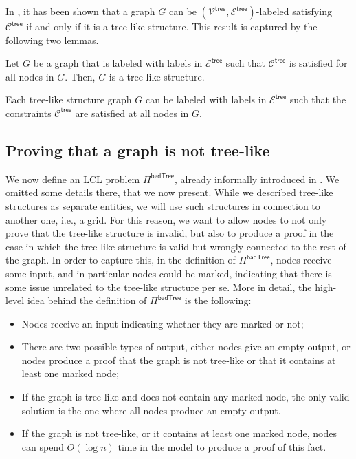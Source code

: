 \documentclass[11pt]{article}
\newcommand{\ltreelike}{\mathsf {tree}}
\newcommand{\lbadtree}{\mathsf {badTree}}
\begin{document}
In \cite{congest-lcls}, it has been shown that a graph $G$ can be $(\mathcal{V^\ltreelike},\mathcal{E^\ltreelike})$-labeled satisfying $\mathcal{C}^{\ltreelike}$ if and only if it is a tree-like structure. This result is captured by the following two lemmas.
\begin{lemma}\label{lem:treelike}
	Let $G$ be a graph that is labeled with labels in $\mathcal{E^\ltreelike}$ such that $\mathcal{C}^{\ltreelike}$ is satisfied for all nodes in $G$. Then, $G$ is a tree-like structure.
\end{lemma}

\begin{lemma}\label{lem:treelike2}
	Each tree-like structure graph $G$ can be labeled with labels in $\mathcal{E^\ltreelike}$ such that the constraints $\mathcal{C}^{\ltreelike}$ are satisfied at all nodes in $G$. 
\end{lemma}


\subsection{Proving that a graph is not tree-like}
We now define an LCL problem $\Pi^{\lbadtree}$, already informally introduced in . We omitted some details there, that we now present.
While we described tree-like structures as separate entities, we will use such structures in connection to another one, i.e., a grid. For this reason, we want to allow nodes to not only prove that the tree-like structure is invalid, but also to produce a proof in the case in which the tree-like structure is valid but wrongly connected to the rest of the graph. In order to capture this, in the definition of $\Pi^{\lbadtree}$, nodes receive some input, and in particular nodes could be marked, indicating that there is some issue unrelated to the tree-like structure per se. More in detail, the high-level idea behind the definition of $\Pi^{\lbadtree}$ is the following:
\begin{itemize}
	\item Nodes receive an input indicating whether they are marked or not;
	\item There are two possible types of output, either nodes give an empty output, or nodes produce a proof that the graph is not tree-like or that it contains at least one marked node;
	\item If the graph is tree-like and does not contain any marked node, the only valid solution is the one where all nodes produce an empty output.
	\item If the graph is not tree-like, or it contains at least one marked node, nodes can spend $O(\log n)$ time in the \local model to produce a proof of this fact.
\end{itemize}
\end{document}
